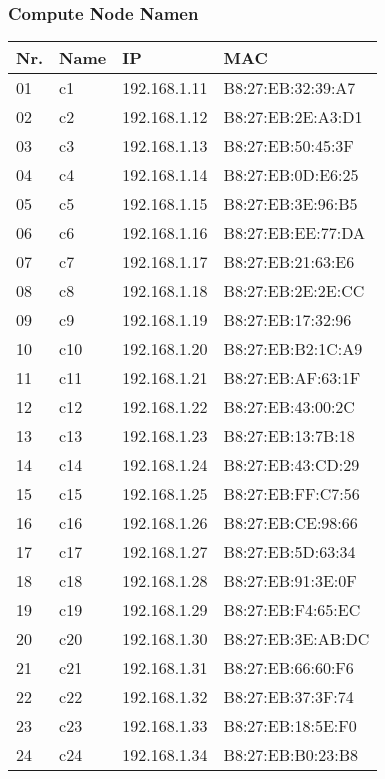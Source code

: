 \subsubsection{Compute Node Namen}
\begin{longtable}{p{1cm}p{2cm}p{6cm}p{6cm}}
\hline
\rowcolor{heading} \textbf{Nr.} & \textbf{Name} & \textbf{IP} & \textbf{MAC} \\\hline
01 & c1 & 192.168.1.11 & B8:27:EB:32:39:A7\\\hline
02 & c2 & 192.168.1.12 & B8:27:EB:2E:A3:D1\\\hline
03 & c3 & 192.168.1.13 & B8:27:EB:50:45:3F\\\hline
04 & c4 & 192.168.1.14 & B8:27:EB:0D:E6:25\\\hline
05 & c5 & 192.168.1.15 & B8:27:EB:3E:96:B5\\\hline
06 & c6 & 192.168.1.16 & B8:27:EB:EE:77:DA\\\hline
07 & c7 & 192.168.1.17 & B8:27:EB:21:63:E6\\\hline
08 & c8 & 192.168.1.18 & B8:27:EB:2E:2E:CC\\\hline
09 & c9 & 192.168.1.19 & B8:27:EB:17:32:96\\\hline
10 & c10 & 192.168.1.20 & B8:27:EB:B2:1C:A9\\\hline
11 & c11 & 192.168.1.21 & B8:27:EB:AF:63:1F\\\hline
12 & c12 & 192.168.1.22 & B8:27:EB:43:00:2C\\\hline
13 & c13 & 192.168.1.23 & B8:27:EB:13:7B:18\\\hline
14 & c14 & 192.168.1.24 & B8:27:EB:43:CD:29\\\hline
15 & c15 & 192.168.1.25 & B8:27:EB:FF:C7:56\\\hline
16 & c16 & 192.168.1.26 & B8:27:EB:CE:98:66\\\hline
17 & c17 & 192.168.1.27 & B8:27:EB:5D:63:34\\\hline
18 & c18 & 192.168.1.28 & B8:27:EB:91:3E:0F\\\hline
19 & c19 & 192.168.1.29 & B8:27:EB:F4:65:EC\\\hline
20 & c20 & 192.168.1.30 & B8:27:EB:3E:AB:DC\\\hline
21 & c21 & 192.168.1.31 & B8:27:EB:66:60:F6\\\hline
22 & c22 & 192.168.1.32 & B8:27:EB:37:3F:74\\\hline
23 & c23 & 192.168.1.33 & B8:27:EB:18:5E:F0\\\hline
24 & c24 & 192.168.1.34 & B8:27:EB:B0:23:B8\\\hline

\end{longtable}
